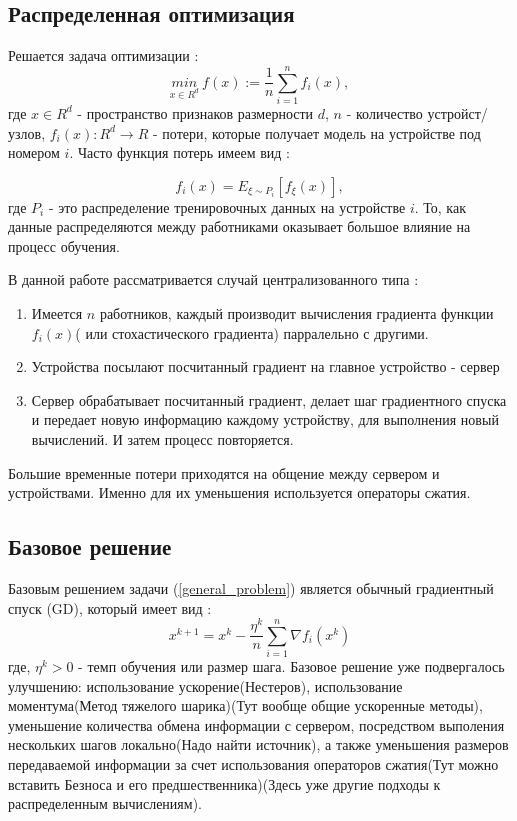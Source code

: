 \documentclass[12pt, twoside]{article}
\begin{document}
\subsection{Распределенная оптимизация}

Решается задача оптимизации :
\begin{equation} 
\label{general_problem}
\underset{x\in R^d}{min} \ f(x) := \frac{1}{n} \sum_{i=1}^n f_i(x),
\end{equation}
где $x \in R^d$ - пространство признаков размерности $d$, $n$ - количество устройст/узлов, $f_i(x) : R^d \rightarrow R$ - потери, которые получает модель на устройстве под номером $i$. Часто функция потерь имеем вид : 

\begin{equation*}f_i(x) = E_{\xi \sim P_i} [f_{\xi}(x)],\end{equation*} где $P_i$ - это распределение тренировочных данных на устройстве $i$. То, как данные распределяются между работниками оказывает большое влияние на процесс обучения.


В данной работе рассматривается случай централизованного типа : 

\begin{enumerate} 
\item  Имеется $n$ работников, каждый производит вычисления градиента функции $f_i(x)$( или стохастического градиента) парралельно с другими.

\item  Устройства посылают посчитанный градиент на главное устройство - сервер

\item  Сервер обрабатывает посчитанный градиент, делает шаг градиентного спуска и передает новую информацию каждому устройству, для выполнения новый вычислений. И затем процесс повторяется.
 
\end{enumerate}
Большие временные потери приходятся на общение между сервером и устройствами. Именно для их уменьшения используется операторы сжатия.

\subsection{Базовое решение}
Базовым решением задачи (\ref{general_problem}) является обычный градиентный спуск (GD), который имеет вид :
\begin{equation}
    \label{GD}
    x^{k+1} = x^k - \frac{\eta^k}{n} \sum_{i=1}^n \nabla f_i(x^k)
\end{equation}
где, $\eta^k > 0$ - темп обучения или размер шага. Базовое решение уже подвергалось улучшению: использование ускорение(Нестеров), использование моментума(Метод тяжелого шарика)(Тут вообще общие ускоренные методы), уменьшение количества обмена информации с сервером, посредством выполения нескольких шагов локально(Надо найти источник), а также уменьшения размеров передаваемой информации за счет использования операторов сжатия(Тут можно вставить Безноса и его предшественника)(Здесь уже другие подходы к распределенным вычислениям).
\end{document}
